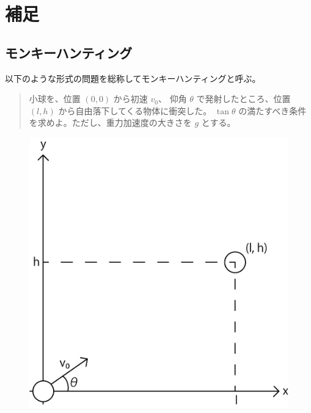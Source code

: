 \chapter{補足}

\section{モンキーハンティング} \label{monkey_hunting}

以下のような形式の問題を総称してモンキーハンティングと呼ぶ。

\begin{quote}
小球を、位置 $(0, 0)$ から初速 $v_0$、 仰角 $\theta$ で発射したところ、位置 $(l, h)$ から自由落下してくる物体に衝突した。 $\tan \theta$ の満たすべき条件を求めよ。ただし、重力加速度の大きさを $g$ とする。
\end{quote}

\begin{figure}[htb]
\centering
\includegraphics{work/monkey_hunting.png}
\end{figure}
